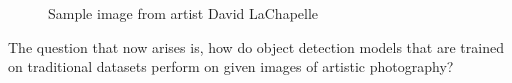 \begin{figure}[H]
	\caption{\label{fig:dl_rapeofafrica} Sample image from artist David LaChapelle}
\end{figure}

The question that now arises is, how do object detection models that are trained on traditional datasets perform on given images of artistic photography?